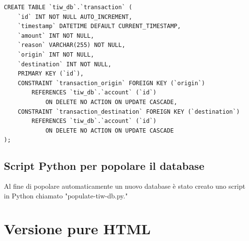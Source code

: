 \documentclass{article}
\begin{document}
\begin{verbatim}
CREATE TABLE `tiw_db`.`transaction` (
	`id` INT NOT NULL AUTO_INCREMENT,
	`timestamp` DATETIME DEFAULT CURRENT_TIMESTAMP,
	`amount` INT NOT NULL,
	`reason` VARCHAR(255) NOT NULL,
	`origin` INT NOT NULL,
	`destination` INT NOT NULL,
	PRIMARY KEY (`id`),
	CONSTRAINT `transaction_origin` FOREIGN KEY (`origin`) 
		REFERENCES `tiw_db`.`account` (`id`)
			ON DELETE NO ACTION ON UPDATE CASCADE,
	CONSTRAINT `transaction_destination` FOREIGN KEY (`destination`) 
		REFERENCES `tiw_db`.`account` (`id`) 
			ON DELETE NO ACTION ON UPDATE CASCADE
);
\end{verbatim}

\subsection{Script Python per popolare il database}
Al fine di popolare automaticamente un nuovo database è stato creato uno script in Python chiamato "populate-tiw-db.py." 

\section{Versione pure HTML}
\end{document}
